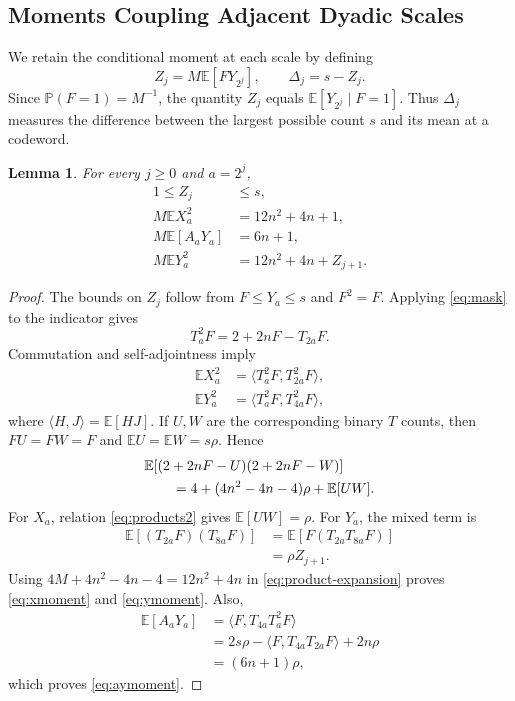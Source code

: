 \documentclass[12pt,letterpaper,onecolumn]{article}
\newtheorem{lemma}[theorem]{Lemma}
\theoremstyle{definition}
\newcommand{\E}{\mathbb{E}}
\newcommand{\Prb}{\mathbb{P}}
\newcommand{\ip}[2]{\langle #1,#2\rangle}
\begin{document}
\subsection{Moments Coupling Adjacent Dyadic Scales}
We retain the conditional moment at each scale by defining
\begin{equation}\label{eq:Z}
 Z_j=M\E[FY_{2^j}],\qquad \Delta_j=s-Z_j.
\end{equation}
Since $\Prb(F=1)=M^{-1}$, the quantity $Z_j$ equals $\E[Y_{2^j}\mid F=1]$. Thus $\Delta_j$ measures the difference between the largest possible count $s$ and its mean at a codeword.

\begin{lemma}\label{lem:moments}
For every $j\ge0$ and $a=2^j$,
\begin{align}
 1\le Z_j&\le s,\label{eq:zbound}\\
 M\E X_a^2&=12n^2+4n+1,\label{eq:xmoment}\\
 M\E[A_aY_a]&=6n+1,\label{eq:aymoment}\\
 M\E Y_a^2&=12n^2+4n+Z_{j+1}.\label{eq:ymoment}
\end{align}
\end{lemma}
\begin{proof}
The bounds on $Z_j$ follow from $F\le Y_a\le s$ and $F^2=F$. Applying \eqref{eq:mask} to the indicator gives
\begin{equation}\label{eq:squared}
 T_a^2F=2+2nF-T_{2a}F.
\end{equation}
Commutation and self-adjointness imply
\begin{align*}
 \E X_a^2&=\ip{T_a^2F}{T_{2a}^2F},\\
 \E Y_a^2&=\ip{T_a^2F}{T_{4a}^2F},
\end{align*}
where $\ip{H}{J}=\E[HJ]$. If $U,W$ are the corresponding binary $T$ counts, then $FU=FW=F$ and $\E U=\E W=s\rho$. Hence
\begin{align}\label{eq:product-expansion}
 &\E[(2+2nF-U)(2+2nF-W)]\nonumber\\
 &\hspace{7mm}=4+(4n^2-4n-4)\rho+\E[UW].
\end{align}
For $X_a$, relation \eqref{eq:products2} gives $\E[UW]=\rho$. For $Y_a$, the mixed term is
\begin{align}\label{eq:next-scale}
 \E[(T_{2a}F)(T_{8a}F)]
 &=\E[F(T_{2a}T_{8a}F)]\nonumber\\
 &=\rho Z_{j+1}.
\end{align}
Using $4M+4n^2-4n-4=12n^2+4n$ in \eqref{eq:product-expansion} proves \eqref{eq:xmoment} and \eqref{eq:ymoment}. Also,
\begin{align*}
 \E[A_aY_a]
 &=\ip{F}{T_{4a}T_a^2F}\\
 &=2s\rho-\ip{F}{T_{4a}T_{2a}F}+2n\rho\\
 &=(6n+1)\rho,
\end{align*}
which proves \eqref{eq:aymoment}.
\end{proof}
\end{document}
